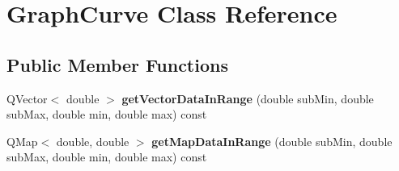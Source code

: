 \hypertarget{class_graph_curve}{\section{Graph\-Curve Class Reference}
\label{class_graph_curve}
}
\subsection*{Public Member Functions}
\begin{DoxyCompactItemize}
\item 
\hypertarget{class_graph_curve_aa3080492b419cd51bb8e57c85c7f636d}{Q\-Vector$<$ double $>$ {\bfseries get\-Vector\-Data\-In\-Range} (double sub\-Min, double sub\-Max, double min, double max) const }\label{class_graph_curve_aa3080492b419cd51bb8e57c85c7f636d}

\item 
\hypertarget{class_graph_curve_a693b4fd4e8901fd56fef8f7b1450cb80}{Q\-Map$<$ double, double $>$ {\bfseries get\-Map\-Data\-In\-Range} (double sub\-Min, double sub\-Max, double min, double max) const }\label{class_graph_curve_a693b4fd4e8901fd56fef8f7b1450cb80}

\end{DoxyCompactItemize}
